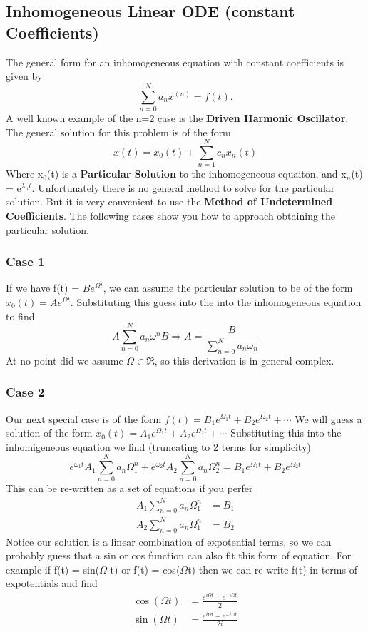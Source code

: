 \documentclass{article}
\newcommand{\be}{\begin{equation}}
\newcommand{\ee}{\end{equation}}
\begin{document}
\subsection*{Inhomogeneous Linear ODE (constant Coefficients)}
The general form for an inhomogeneous equation with constant coefficients is given by
\be
	\sum_{n=0}^N a_n x^{(n)} = f(t) .
\ee
A well known example of the n=2 case is the \textbf{Driven Harmonic Oscillator}.
The general solution for this problem is of the form
\be
x(t) = x_0(t) + \sum_{n=1}^N c_nx_n(t)
\ee
Where x$_0$(t) is a \textbf{Particular Solution} to the inhomogeneous equaiton, and x$_n$(t) = e$^{\lambda_n t}$.
Unfortunately there is no general method to solve for the particular solution.
But it is very convenient to use the \textbf{Method of Undetermined Coefficients}.
The following cases show you how to approach obtaining the particular solution.

\subsubsection*{Case 1}
If we have f(t) = $Be^{\Omega t}$, we can assume the particular solution to be of the form $x_0(t) = Ae^{\Omega t}$.
Substituting this guess into the into the inhomogeneous equation to find
\be
A \sum_{n=0}^N a_n \omega^n B \Rightarrow A = \frac{B}{\sum_{n=0}^N a_n \omega_n}
\ee
At no point did we assume $\Omega \in \Re$, so this derivation is in general complex.

\subsubsection*{Case 2}
Our next special case is of the form $f(t) = B_1e^{\Omega_1t} + B_2e^{\Omega_2t} + \cdots$
We will guess a solution of the form $x_0(t) = A_1 e^{\Omega_1t} + A_2 e^{\Omega_2t} + \cdots$
Substituting this into the inhomigeneous equation we find  (truncating to 2 terms for simplicity)
\be
e^{\omega_1t} A_1\sum_{n=0}^N a_n \Omega_1^n + e^{\omega_2t} A_2\sum_{n=0}^N a_n \Omega_2^n = B_1e^{\Omega_1 t} + B_2 e^{\Omega_2 t}
\ee
This can be re-written as a set of equations if you perfer
\be
\begin{split}
    A_1 \sum_{n=0}^N a_n\Omega_1^n &= B_1\\
    A_2 \sum_{n=0}^N a_n\Omega_1^n &= B_2
\end{split}
\ee
Notice our solution is a linear combination of expotential terms, so we can probably guess that a sin or cos function can also fit this form of equation.
For example if f(t) = sin($\Omega$ t) or f(t) = cos($\Omega$t) then we can re-write f(t) in terms of expotentials and find
\be
\begin{split}
    \cos(\Omega t) &= \frac{e^{i\Omega t} + e^{-i\Omega t}}{2}\\
    \sin(\Omega t) &= \frac{e^{i\Omega t} - e^{-i\Omega t}}{2i}\\
\end{split}
\ee
\end{document}
